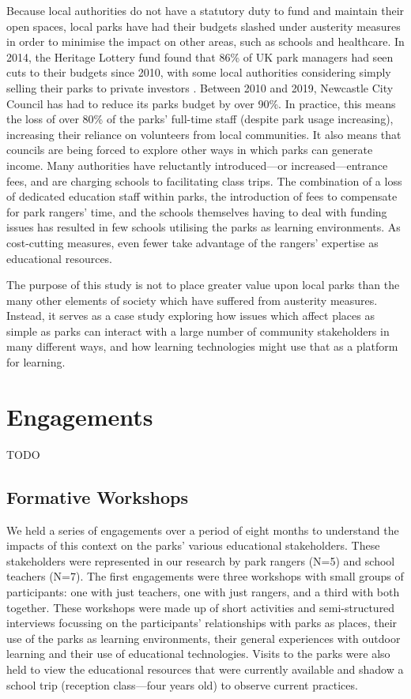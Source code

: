 Because local authorities do not have a statutory duty to fund and maintain their open spaces, local parks have had their budgets slashed under austerity measures in order to minimise the impact on other areas, such as schools and healthcare. In 2014, the Heritage Lottery fund found that 86\% of UK park managers had seen cuts to their budgets since 2010, with some local authorities considering simply selling their parks to private investors \citep{HeritageLotteryFund2014}. Between 2010 and 2019, Newcastle City Council has had to reduce its parks budget by over 90\%. In practice, this means the loss of over 80\% of the parks' full-time staff (despite park usage increasing), increasing their reliance on volunteers from local communities.  It also means that councils are being forced to explore other ways in which parks can generate income. Many authorities have reluctantly introduced---or increased---entrance fees, and are charging schools to facilitating class trips. The combination of a loss of dedicated education staff within parks, the introduction of fees to compensate for park rangers’ time, and the schools themselves having to deal with funding issues has resulted in few schools utilising the parks as learning environments. As cost-cutting measures, even fewer take advantage of the rangers’ expertise as educational resources.

The purpose of this study is not to place greater value upon local parks than the many other elements of society which have suffered from austerity measures. Instead, it serves as a case study exploring how issues which affect places as simple as parks can interact with a large number of community stakeholders in many different ways, and how learning technologies might use that as a platform for learning.

\section{Engagements}

TODO

\subsection{Formative Workshops}

We held a series of engagements over a period of eight months to understand the impacts of this context on the parks’ various educational stakeholders. These stakeholders were represented in our research by park rangers (N=5) and school teachers (N=7). The first engagements were three workshops with small groups of participants: one with just teachers, one with just rangers, and a third with both together. These workshops were made up of short activities and semi-structured interviews focussing on the participants’ relationships with parks as places, their use of the parks as learning environments, their general experiences with outdoor learning and their use of educational technologies. Visits to the parks were also held to view the educational resources that were currently available and shadow a school trip (reception class—four years old) to observe current practices.

